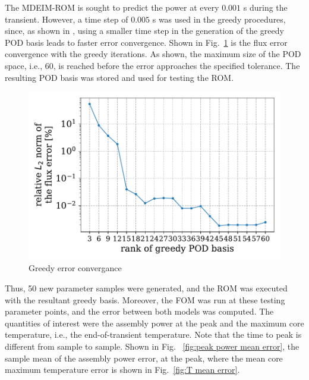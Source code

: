 \documentclass[review,number,sort&compress,12pt]{elsarticle}
\begin{document}
The MDEIM-ROM is sought to predict the power at every $0.001$ s during the transient.
However, a time step of $0.005$ s was used in the greedy procedures, since, as shown in \cite{elzohery2021exploring}, using a smaller time step in the generation of the greedy POD basis leads to faster error convergence.
Shown in Fig.~\ref{fig:lra greedy error} is the flux error convergence with the greedy iterations.
As shown, the maximum size of the POD space, i.e., 60, is reached before the error approaches the specified tolerance.
The resulting POD basis was stored and used for testing the ROM.

\begin{figure}[H]
	\centering
	\includegraphics[width=0.9\linewidth]{../figures/greedy_convergance.pdf}
	\caption{Greedy error convergance}
	\label{fig:lra greedy error}
\end{figure}

Thus, 50 new parameter samples were generated, and the ROM was executed with the resultant greedy basis.
Moreover, the FOM was run at these testing parameter points, and the error between both models was computed.
The quantities of interest were the assembly power at the peak and the maximum core temperature, i.e., the end-of-transient temperature.
Note that the time to peak is different from sample to sample.
Shown in Fig.~ \ref{fig:peak power mean error}, the sample mean of the assembly power error, at the peak, where the mean core maximum temperature error is shown in Fig.~\ref{fig:T mean error}.
\end{document}
